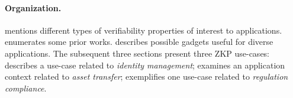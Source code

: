 \paragraph{Organization.}
 mentions different types of verifiability properties of interest to applications.
 enumerates some prior works.
 describes possible gadgets useful for diverse applications.
The subsequent three sections present three ZKP use-cases:
 describes a use-case related to \emph{identity management};
 examines an application context related to \emph{asset transfer};
 exemplifies one use-case related to \emph{regulation compliance}.
